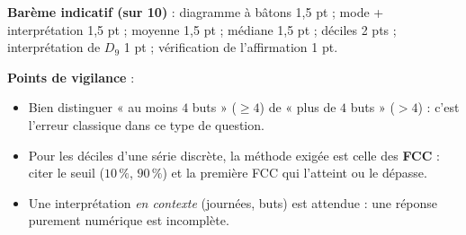\documentclass[11pt]{article}
\begin{document}
\begin{corrige}
\textbf{Barème indicatif (sur 10)} : diagramme à bâtons 1,5 pt ; mode + interprétation 1,5 pt ; moyenne 1,5 pt ; médiane 1,5 pt ; déciles 2 pts ; interprétation de $D_9$ 1 pt ; vérification de l'affirmation 1 pt.

\textbf{Points de vigilance} :
\begin{itemize}
    \item Bien distinguer « au moins $4$ buts » ($\ge 4$) de « plus de $4$ buts » ($>4$) : c'est l'erreur classique dans ce type de question.
    \item Pour les déciles d'une série discrète, la méthode exigée est celle des \textbf{FCC} : citer le seuil ($10\,\%$, $90\,\%$) et la première FCC qui l'atteint ou le dépasse.
    \item Une interprétation \emph{en contexte} (journées, buts) est attendue : une réponse purement numérique est incomplète.
\end{itemize}
\end{corrige}
\end{document}
